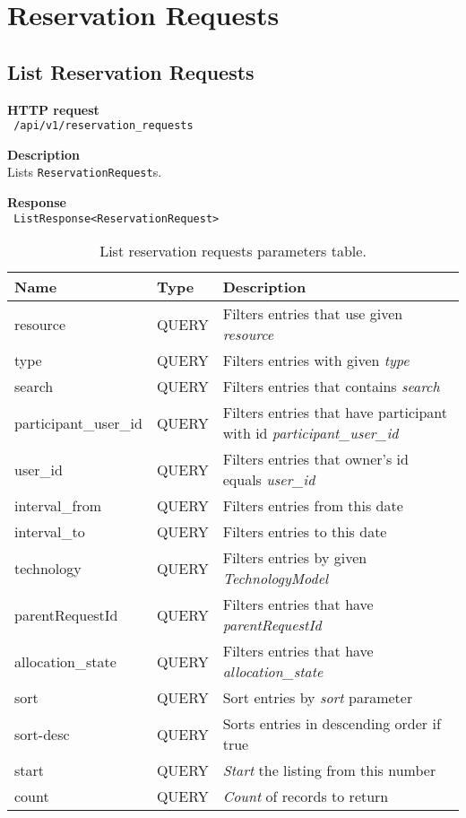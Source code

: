 \section{Reservation Requests}
\subsection{List Reservation Requests}
\begin{description}
    \item \textbf{HTTP request}\\
        \texttt{\text{[GET]} /api/v1/reservation\_requests}
    \item \textbf{Description}\\
        Lists \texttt{ReservationRequest}s.
    \item \textbf{Response}\\
        \texttt{\text{[200 OK]} ListResponse<ReservationRequest>}
\end{description}
\begin{table}[ht!]
    \begin{tabularx}{\textwidth}{llX}
        \toprule
        Name & Type & Description \\
        \midrule
        resource & QUERY & Filters entries that use given \emph{resource} \\
        type & QUERY & Filters entries with given \emph{type} \\
        search & QUERY & Filters entries that contains \emph{search} \\
        participant\_user\_id & QUERY &  Filters entries that have participant with id \emph{participant\_user\_id} \\
        user\_id & QUERY & Filters entries that owner's id equals \emph{user\_id} \\
        interval\_from & QUERY & Filters entries from this date \\  
        interval\_to & QUERY & Filters entries to this date \\
        technology & QUERY & Filters entries by given \emph{TechnologyModel} \\
        parentRequestId & QUERY & Filters entries that have \emph{parentRequestId} \\
        allocation\_state & QUERY & Filters entries that have \emph{allocation\_state} \\
        sort & QUERY & Sort entries by \emph{sort} parameter \\
        sort-desc & QUERY & Sorts entries in descending order if true \\
        start & QUERY & \emph{Start} the listing from this number \\  
        count & QUERY & \emph{Count} of records to return \\
        \bottomrule
        \end{tabularx}
    \caption{List reservation requests parameters table.}
\end{table}

